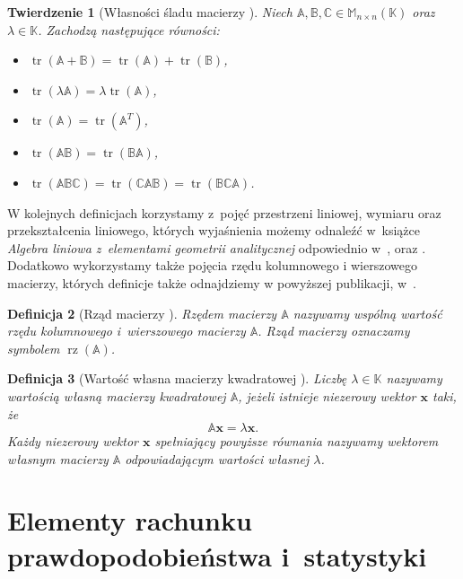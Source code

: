 \documentclass[12pt,a4paper]{report}
\newtheorem{df}{Definicja}[chapter]
\newtheorem{tw}[df]{Twierdzenie}
\newcommand{\setK}{\mathbb{K}}
\newcommand{\rz}[1]{\operatorname{rz}\left({#1} \right)}
\newcommand{\tr}[1]{\operatorname{tr}\left({#1} \right)}
\begin{document}
\begin{tw}[Własności śladu macierzy {\citep[Sec 6.4]{ealIII}}]
Niech $\mathbb{A}, \mathbb{B}, \mathbb{C} \in \mathbb{M}_{n \times n} (\setK)$ oraz $\lambda \in \setK$.
Zachodzą następujące równości:
\begin{itemize}
\item $\tr{\mathbb{A} + \mathbb{B}} = \tr{\mathbb{A}} + \tr{\mathbb{B}}$,
\item $\tr{\lambda \mathbb{A}} = \lambda \tr{\mathbb{A}}$,
\item $\tr{\mathbb{A}} =\tr{\mathbb{A}^T}$,
\item $\tr{\mathbb{A} \mathbb{B}}  = \tr{\mathbb{B} \mathbb{A}} $,
\item $\tr{\mathbb{A} \mathbb{B} \mathbb{C}}  = \tr{\mathbb{C} \mathbb{A} \mathbb{B}} = \tr{\mathbb{B} \mathbb{C} \mathbb{A}}$.
\end{itemize}
\end{tw}

W kolejnych definicjach korzystamy z~pojęć przestrzeni liniowej, wymiaru oraz przekształcenia liniowego, których wyjaśnienia możemy odnaleźć w~książce \textit{Algebra liniowa z~elementami geometrii analitycznej} odpowiednio w~{\citep[Sec 7.1]{alzega}}, {\citep[Sec 7.5]{alzega}} oraz {\citep[Sec 9.1]{alzega}}. Dodatkowo wykorzystamy także pojęcia rzędu kolumnowego i wierszowego macierzy, których definicje także odnajdziemy w powyższej publikacji, w~{\citep[Sec 8.1]{alzega}}.

\begin{df}[Rząd macierzy {\citep[Sec 8.1]{alzega}}]
Rzędem macierzy $\mathbb{A}$ nazywamy wspólną wartość rzędu kolumnowego i~wierszowego macierzy $\mathbb{A}$. Rząd macierzy oznaczamy symbolem $\rz{\mathbb{A}}$.
\end{df}


\begin{df}[Wartość własna macierzy kwadratowej {\citep[Sec 13.1]{ealIII}}]
Liczbę $\lambda \in \setK$ nazywamy wartością własną macierzy kwadratowej $\mathbb{A}$, jeżeli istnieje niezerowy wektor $\mathbf{x}$ taki, że
$$
\mathbb{A}\mathbf{x}=\lambda\mathbf{x}.
$$
Każdy niezerowy wektor $\mathbf{x}$ spełniający powyższe równania nazywamy wektorem własnym macierzy $\mathbb{A}$ odpowiadającym wartości własnej $\lambda$.
\end{df}


\section{Elementy rachunku prawdopodobieństwa i~statystyki}
\end{document}
